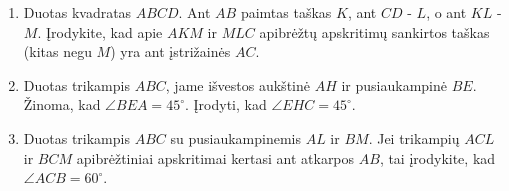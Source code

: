 \begin{enumerate}
\item Duotas kvadratas $ABCD$. Ant $AB$ paimtas taškas $K$,
  ant $CD$ - $L$, o ant $KL$ - $M$. Įrodykite, kad apie
  $AKM$ ir $MLC$ apibrėžtų apskritimų sankirtos taškas
  (kitas negu $M$) yra ant įstrižainės $AC$.
\item Duotas trikampis $ABC$, jame išvestos aukštinė $AH$ ir
  pusiaukampinė $BE$. Žinoma, kad $\angle BEA = 45^\circ$.
  Įrodyti, kad $\angle EHC = 45^\circ$.
\item Duotas trikampis $ABC$ su pusiaukampinemis $AL$ ir
  $BM$. Jei trikampių $ACL$ ir $BCM$ apibrėžtiniai
  apskritimai kertasi ant atkarpos $AB$, tai įrodykite, kad
  $\angle ACB=60^\circ$.

\end{enumerate}
